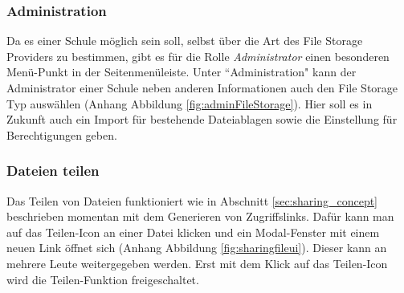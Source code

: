 \subsubsection{Administration}

Da es einer Schule möglich sein soll, selbst über die Art des File Storage Providers zu bestimmen, gibt es für die Rolle \textit{Administrator} einen besonderen Menü-Punkt in der Seitenmenüleiste. Unter ``Administration" kann der Administrator einer Schule neben anderen Informationen auch den File Storage Typ auswählen (Anhang Abbildung \ref{fig:adminFileStorage}). Hier soll es in Zukunft auch ein Import für bestehende Dateiablagen sowie die Einstellung für Berechtigungen geben.

\subsubsection{Dateien teilen}

Das Teilen von Dateien funktioniert wie in Abschnitt \ref{sec:sharing_concept} beschrieben momentan mit dem Generieren von Zugriffslinks. Dafür kann man auf das Teilen-Icon an einer Datei klicken und ein Modal-Fenster mit einem neuen Link öffnet sich (Anhang Abbildung \ref{fig:sharingfileui}). Dieser kann an mehrere Leute weitergegeben werden. Erst mit dem Klick auf das Teilen-Icon wird die Teilen-Funktion freigeschaltet. 

\clearpage
